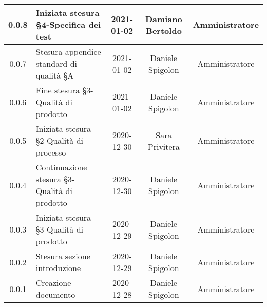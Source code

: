 \begin{center}
\begin{longtable}{|c|p{5cm}|c|c|c|}
	\hline
	0.0.8 & Iniziata stesura §4-Specifica dei test & 2021-01-02 & Damiano Bertoldo & Amministratore \\
	\hline
	0.0.7 & Stesura appendice standard di qualità §A & 2021-01-02 & Daniele Spigolon & Amministratore \\
	\hline
	0.0.6 & Fine stesura §3-Qualità di prodotto & 2021-01-02 & Daniele Spigolon & Amministratore \\
	\hline
	0.0.5 & Iniziata stesura §2-Qualità di processo & 2020-12-30 & Sara Privitera & Amministratore \\
	\hline
	0.0.4 & Continuazione stesura §3-Qualità di prodotto & 2020-12-30 & Daniele Spigolon & Amministratore \\
	\hline
	0.0.3 & Iniziata stesura §3-Qualità di prodotto & 2020-12-29 & Daniele Spigolon & Amministratore \\
	\hline
	0.0.2 & Stesura sezione introduzione & 2020-12-29 & Daniele Spigolon & Amministratore \\
	\hline
	0.0.1 & Creazione documento & 2020-12-28 & Daniele Spigolon & Amministratore \\
	\hline

	\end{longtable}
\end{center}